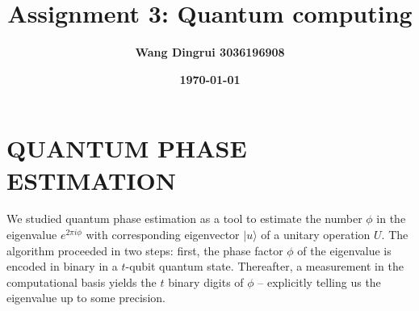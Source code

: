 \documentclass[12pt]{article}
\title{\textbf{Assignment 3: Quantum computing}}
\author{\textbf{Wang Dingrui 3036196908}}
\date{\textbf{\today}}
\begin{document}
\maketitle

\section{QUANTUM PHASE ESTIMATION}
We studied quantum phase estimation as a tool to estimate the number $\phi$ in the eigenvalue $e^{2\pi i\phi}$ with corresponding eigenvector $|u\rangle$ of a unitary operation $U$. The algorithm proceeded in two steps: first, the phase factor $\phi$ of the eigenvalue is encoded in binary in a $t$-qubit quantum state. Thereafter, a measurement in the computational basis yields the $t$ binary digits of $\phi$ – explicitly telling us the eigenvalue up to some precision.
\end{document}
